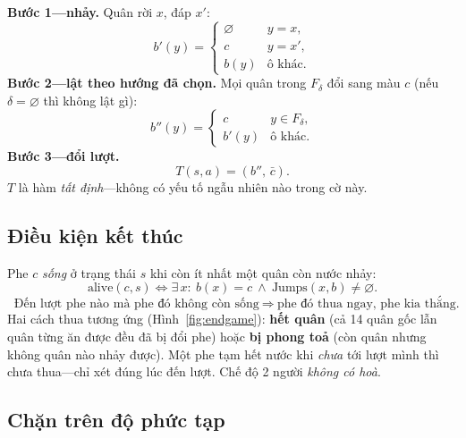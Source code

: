 \noindent\textbf{Bước 1---nhảy.} Quân rời $x$, đáp $x'$:
\begin{equation}
b'(y)=\begin{cases}\varnothing & y=x,\\ c & y=x',\\ b(y) & \text{ô khác}.\end{cases}
\label{eq:t1}
\end{equation}
\textbf{Bước 2---lật theo hướng đã chọn.} Mọi quân trong $F_\delta$ đổi
sang màu $c$ (nếu $\delta=\varnothing$ thì không lật gì):
\begin{equation}
b''(y)=\begin{cases}c & y\in F_\delta,\\ b'(y) & \text{ô khác}.\end{cases}
\label{eq:t2}
\end{equation}
\textbf{Bước 3---đổi lượt.}
\begin{equation}
\boxed{\;T(s,a)=(b'',\,\bar c).\;}
\label{eq:t3}
\end{equation}
$T$ là hàm \emph{tất định}---không có yếu tố ngẫu nhiên nào trong cờ này.

\subsection{Điều kiện kết thúc}
\label{ssec:terminal}

Phe $c$ \emph{sống} ở trạng thái $s$ khi còn ít nhất một quân còn nước
nhảy:
\begin{equation}
\mathrm{alive}(c,s)\iff \exists\,x:\ b(x)=c\ \wedge\ \mathrm{Jumps}(x,b)\neq\varnothing.
\label{eq:alive}
\end{equation}
\begin{equation}
\boxed{\;\text{Đến lượt phe nào mà phe đó không còn sống}
\ \Rightarrow\ \text{phe đó thua ngay, phe kia thắng.}\;}
\label{eq:terminal}
\end{equation}
Hai cách thua tương ứng (Hình~\ref{fig:endgame}): \textbf{hết quân} (cả
14 quân gốc lẫn quân từng ăn được đều đã bị đổi phe) hoặc \textbf{bị phong
toả} (còn quân nhưng không quân nào nhảy được). Một phe tạm hết nước khi
\emph{chưa} tới lượt mình thì chưa thua---chỉ xét đúng lúc đến lượt. Chế
độ 2 người \emph{không có hoà}.

\subsection{Chặn trên độ phức tạp}
\label{ssec:complexity}

